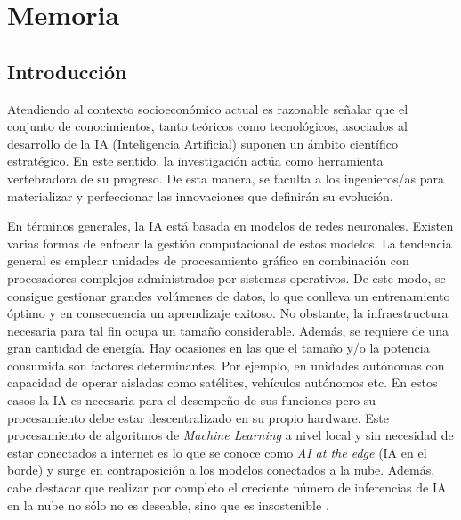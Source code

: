 
\chapter{Memoria} %

\label{Memoria} %

\section{Introducción}

Atendiendo al contexto socioeconómico actual es razonable señalar que el conjunto de conocimientos, tanto teóricos como tecnológicos, asociados al desarrollo de la IA (Inteligencia Artificial) suponen un ámbito científico estratégico. 
En este sentido, la investigación actúa como herramienta vertebradora de su progreso. 
De esta manera, se faculta a los ingenieros/as para materializar y perfeccionar las innovaciones que definirán su evolución. 

En términos generales, la IA está basada en modelos de redes neuronales.
Existen varias formas de enfocar la gestión computacional de estos modelos.
La tendencia general es emplear unidades de procesamiento gráfico en combinación con procesadores complejos administrados por sistemas operativos. 
De este modo, se consigue gestionar grandes volúmenes de datos, lo que conlleva un entrenamiento óptimo y en consecuencia un aprendizaje exitoso.
No obstante, la infraestructura necesaria para tal fin ocupa un tamaño considerable.
Además, se requiere de una gran cantidad de energía.
Hay ocasiones en las que el tamaño y/o la potencia consumida son factores determinantes.
Por ejemplo, en unidades autónomas con capacidad de operar aisladas como satélites, vehículos autónomos etc.
En estos casos la IA es necesaria para el desempeño de sus funciones pero su procesamiento debe estar descentralizado en su propio hardware.
Este procesamiento de algoritmos de \textit{Machine Learning} a nivel local y sin necesidad de estar conectados a internet es lo que se conoce como \textit{AI at the edge} \cite{IA-edge} (IA en el borde) y surge en contraposición a los modelos conectados a la nube.
Además, cabe destacar que realizar por completo el creciente número de inferencias de IA en la nube no sólo no es deseable, sino que es insostenible \cite{Efficient-Inference}. 

